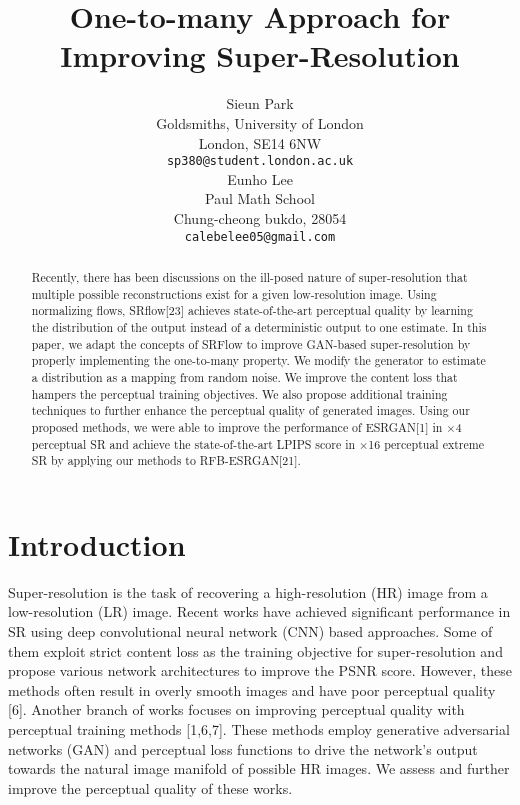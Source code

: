 \documentclass{article}
\title{One-to-many Approach for Improving Super-Resolution}
\author{Sieun Park \\
  Goldsmiths, University of London\\
  London, SE14 6NW \\
  \texttt{sp380@student.london.ac.uk} \\
\And
   Eunho Lee \\
   Paul Math School \\
   Chung-cheong bukdo, 28054 \\
   \texttt{calebelee05@gmail.com} \\
}
\begin{document}
\maketitle

\begin{abstract}


  Recently, there has been discussions on the ill-posed nature of super-resolution that multiple possible reconstructions exist for a given low-resolution image. Using normalizing flows, SRflow[23] achieves state-of-the-art perceptual quality by learning the distribution of the output instead of a deterministic output to one estimate. In this paper, we adapt the concepts of SRFlow to improve GAN-based super-resolution by properly implementing the one-to-many property. We modify the generator to estimate a distribution as a mapping from random noise. We improve the  content loss that hampers the perceptual training objectives. We also propose additional training techniques to further enhance the perceptual quality of generated images. Using our proposed methods, we were able to improve the performance of ESRGAN[1] in $\times$4 perceptual SR and achieve the state-of-the-art LPIPS score in $\times$16 perceptual extreme SR by applying our methods to RFB-ESRGAN[21].
  
\end{abstract}


\section{Introduction}

Super-resolution is the task of recovering a high-resolution (HR) image from a low-resolution (LR) image. Recent works have achieved significant performance in SR using deep convolutional neural network (CNN) based approaches. Some of them exploit strict content loss as the training objective for super-resolution and propose various network architectures to improve the PSNR score. However, these methods often result in overly smooth images and have poor perceptual quality [6]. Another branch of works focuses on improving perceptual quality with perceptual training methods [1,6,7]. These methods employ generative adversarial networks (GAN) and perceptual loss functions to drive the network's output towards the natural image manifold of possible HR images. We assess and further improve the perceptual quality of these works.
\end{document}
